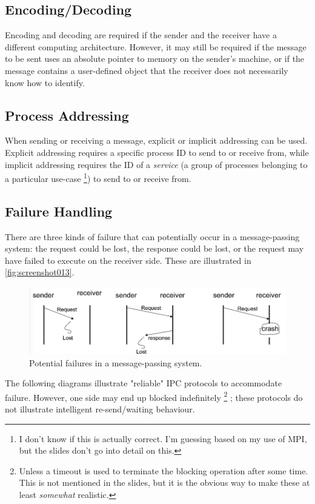 \subsection{Encoding/Decoding}
Encoding and decoding are required if the sender and the receiver have a different computing architecture. However, it may still be required if the message to be sent uses an absolute pointer to memory on the sender's machine, or if the message contains a user-defined object that the receiver does not necessarily know how to identify.

\subsection{Process Addressing}
When sending or receiving a message, explicit or implicit addressing can be used. Explicit addressing requires a specific process ID to send to or receive from, while implicit addressing requires the ID of a \textit{service} (a group of processes belonging to a particular use-case \footnote{I don't know if this is actually correct. I'm guessing based on my use of MPI, but the slides don't go into detail on this.}) to send to or receive from.

\subsection{Failure Handling}
There are three kinds of failure that can potentially occur in a message-passing system: the request could be lost, the response could be lost, or the request may have failed to execute on the receiver side. These are illustrated in \autoref{fig:screenshot013}.

\begin{figure}[h]
\centering
\includegraphics[width=0.6\linewidth]{screenshot013}
\caption{Potential failures in a message-passing system.}
\label{fig:screenshot013}
\end{figure}

The following diagrams illustrate "reliable" IPC protocols to accommodate failure. However, one side may end up blocked indefinitely \footnote{Unless a timeout is used to terminate the blocking operation after some time. This is not mentioned in the slides, but it is the obvious way to make these at least \textit{somewhat} realistic.} ; these protocols do not illustrate intelligent re-send/waiting behaviour.

